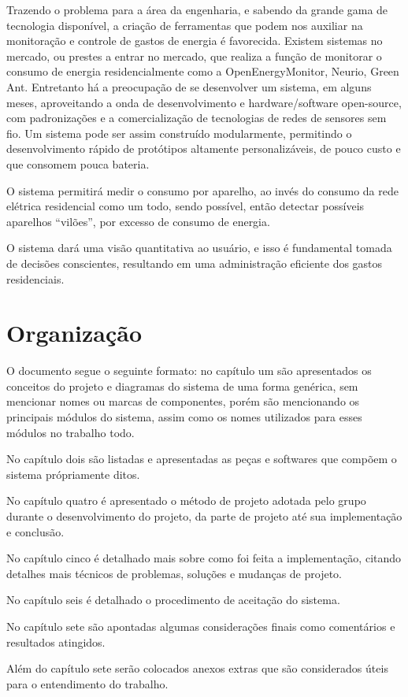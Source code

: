 Trazendo o problema para a área da engenharia, e sabendo da grande gama de tecnologia disponível, a criação de ferramentas que podem nos auxiliar na monitoração e controle de gastos de energia é favorecida. Existem sistemas no mercado, ou prestes a entrar no mercado, que realiza a função de monitorar o consumo de energia residencialmente como a OpenEnergyMonitor\cite{open_energy_monitor}, Neurio\cite{neurio_site}, Green Ant\cite{green_ant_site}. Entretanto há a preocupação de se desenvolver um sistema, em alguns meses, aproveitando a onda de desenvolvimento e hardware/software open-source, com padronizações e a comercialização de tecnologias de redes de sensores sem fio. Um sistema pode ser assim construído modularmente, permitindo o desenvolvimento rápido de protótipos altamente personalizáveis, de pouco custo e que consomem pouca bateria.

O sistema permitirá medir o consumo por aparelho, ao invés do consumo da rede elétrica residencial como um todo, sendo possível, então detectar possíveis aparelhos “vilões”, por excesso de consumo de energia.

O sistema dará uma visão quantitativa ao usuário, e isso é fundamental tomada de decisões conscientes, resultando em uma administração eficiente dos gastos residenciais.

\section{Organização}
\label{Sec:organizacao}

O documento segue o seguinte formato: no capítulo um são apresentados os conceitos do projeto e diagramas do sistema de uma forma genérica, sem mencionar nomes ou marcas de componentes, porém são mencionando os principais módulos do sistema, assim como os nomes utilizados para esses módulos no trabalho todo.

No capítulo dois são listadas e apresentadas as peças e softwares que compõem o sistema própriamente ditos. 

No capítulo quatro é apresentado o método de projeto adotada pelo grupo durante o desenvolvimento do projeto, da parte de projeto até sua implementação e conclusão.

No capítulo cinco é detalhado mais sobre como foi feita a implementação, citando detalhes mais técnicos de problemas, soluções e mudanças de projeto.

No capítulo seis é detalhado o procedimento de aceitação do sistema.

No capítulo sete são apontadas algumas considerações finais como comentários e resultados atingidos.

Além do capítulo sete serão colocados anexos extras que são considerados úteis para o entendimento do trabalho.